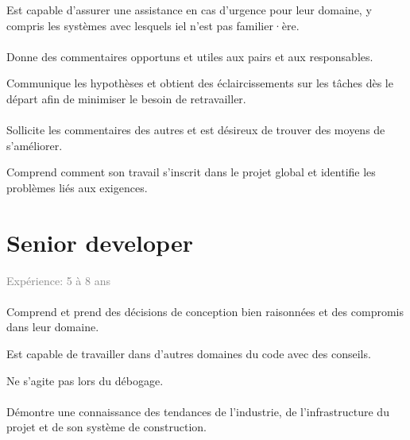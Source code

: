 \documentclass[a4paper, french, openany, 12pt]{book}
\newcommand\dex{\textcolor{BrickRed}{\textbf{\bsc{Dex}}}}
\newcommand\str{\textcolor{DarkOrchid}{\textbf{\bsc{Str}}}}
\newcommand\cha{\textcolor{RawSienna}{\textbf{\bsc{Cha}}}}
\newcommand\xp[1]{\textcolor{Gray}{Expérience: {#1} ans}}
\begin{document}
Est capable d'assurer une assistance en cas d'urgence pour leur domaine, y compris les systèmes avec lesquels iel 
n'est pas familier·ère.

\subsubsection*{\cha}

Donne des commentaires opportuns et utiles aux pairs et aux responsables.

Communique les hypothèses et obtient des éclaircissements sur les tâches dès le départ afin de minimiser le besoin de 
retravailler.

\subsubsection*{\cha}

Sollicite les commentaires des autres et est désireux de trouver des moyens de s'améliorer.

Comprend comment son travail s'inscrit dans le projet global et identifie les problèmes liés aux exigences.

\chapter{Senior developer}

\xp{5 à 8}

\subsubsection*{\dex}

Comprend et prend des décisions de conception bien raisonnées et des compromis dans leur domaine.

Est capable de travailler dans d'autres domaines du code avec des conseils.

Ne s'agite pas lors du débogage.

\subsubsection*{\dex}

Démontre une connaissance des tendances de l'industrie, de l'infrastructure du projet et de son système de construction.

\subsubsection*{\str}
\end{document}
